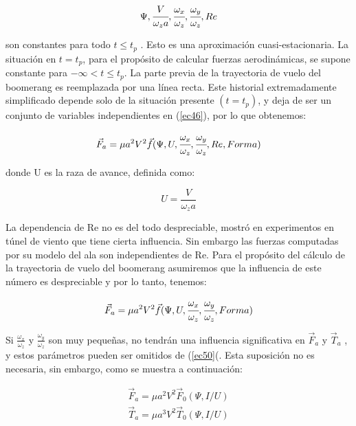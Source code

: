 		\begin{equation}
		\Psi,\cfrac{V}{{\omega}_{z}a},\cfrac{{\omega}_{x}}{{\omega}_{z}},\cfrac{{\omega}_{y}}{{\omega}_{z}},Re
		\label{ec47}
		\end{equation}

	son constantes para todo $t\le{t}_{p}$ . Esto es una aproximación cuasi-estacionaria. La situación en
  	$t={t}_{p}$, para el propósito de calcular fuerzas aerodinámicas, se supone constante para $-\infty <t\le{t}_{p}$. La parte previa de la trayectoria de vuelo del boomerang es reemplazada por una línea recta. Este historial extremadamente simplificado depende solo de la situación presente $(t={t}_{p})$, y deja de ser un conjunto de variables independientes en (\ref{ec46}), por lo que obtenemos:

		\begin{equation}
		{\vec{F}}_{a}={\mu}{a}^{2}{V}^{2}\vec{f}(\Psi,U,\cfrac{{\omega}_{x}}{{\omega}_{z}},\cfrac{{\omega}_{y}}{{\omega}_{z}},Re,Forma)
		\label{ec48}
		\end{equation}

	donde U es la raza de avance, definida como:

		\begin{equation}
		U=\frac{V}{{\omega}_{z}a}
		\label{ec49}
		\end{equation}

	La dependencia de Re no es del todo despreciable, \cite{Hess1975} mostró en experimentos en túnel de viento que tiene cierta influencia. Sin embargo las fuerzas computadas por su modelo del ala son independientes de Re. Para el propósito del cálculo de la trayectoria de vuelo del boomerang asumiremos que la influencia de este número es despreciable y por lo tanto, tenemos:

		\begin{equation}
		{\vec{F}}_{a}={\mu}{a}^{2}{V}^{2}\vec{f}(\Psi,U,\cfrac{{\omega}_{x}}{{\omega}_{z}},\cfrac{{\omega}_{y}}{{\omega}_{z}},Forma)
		\label{ec50}
		\end{equation}

	Si $\frac{{\omega}_{x}}{{\omega}_{z}}$ y $\frac{{\omega}_{y}}{{\omega}_{z}}$ son muy pequeñas, no tendrán una influencia significativa en ${\vec{F}}_{a}$ y ${\vec{T}}_{a}$ , y estos parámetros pueden ser omitidos de (\ref{ec50}(. Esta suposición no es necesaria, sin embargo, como se muestra a continuación:

		\begin{subequations}
    	\begin{align}
    	{\vec{F}}_{a}={\mu}{a}^{2}{V}^{2}{\vec{F}}_{0}(\Psi,I/U)\\
    	{\vec{T}}_{a}={\mu}{a}^{3}{V}^{2}{\vec{T}}_{0}(\Psi,I/U)
		\end{align}
		\label{ec51}
		\end{subequations}

